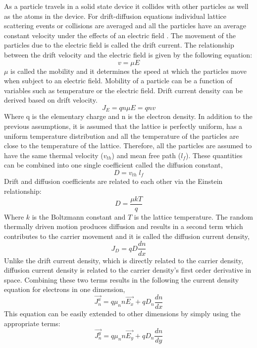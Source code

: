 \begin{doublespace}
As a particle travels in a solid state device it collides with other particles as well as the atoms in the device. For  drift-diffusion equations individual lattice scattering events or collisions are averaged and all the particles have an average constant  velocity under the effects of an electric field \cite{snowden}. The movement of the particles due to the electric field is called the drift current. The relationship between the drift velocity and the electric field is given by the following equation:
\begin{equation}
v=\mu E
\end{equation}
$\mu$ is called the mobility and it determines the  speed at which the particles  move when subject to an electric field. Mobility of a particle can be a function of  variables such as temperature or the electric field. Drift current density can be derived based on  drift velocity\cite{snowden}.
\begin{equation}
J_E=q n\mu E=q n v 
\end{equation}
Where q is the elementary charge and n is the electron density. In addition to the previous assumptions, it is assumed that the lattice is perfectly uniform, has a uniform temperature distribution and all the temperature of the particles are close to the temperature of the lattice. Therefore, all the particles are assumed to have the same thermal velocity ($v_{th}$) and mean free path ($l_f$). These quantities can be combined into one single coefficient called the diffusion constant,
\begin{equation}
D=v_{th} \;l_f
\end{equation}
 Drift and diffusion coefficients are related to each other via the Einstein relationship\cite{snowden}:
\begin{equation}
D=\frac{\mu k T}{q}
\end{equation}
Where $k$ is the Boltzmann constant and $T$ is the lattice temperature. The random thermally driven motion produces diffusion and results in a second term which contributes to the carrier movement and it is called the diffusion current density,
\begin{equation}
J_D=qD\frac{dn}{dx}
\end{equation}
Unlike the drift current density, which is directly related to the carrier density, diffusion current density is related to the carrier density's first order derivative in space. Combining these two terms results in the following the current density equation for electrons in one dimension,
\begin{equation}
\vec{J_n^x}=q \mu_{n} n \vec{E_x}+qD_{n} \frac{dn}{dx} 
\label{cdenn}
\end{equation}
This equation can be easily extended to other dimensions by simply using the appropriate terms:
\begin{equation}
\vec{J_n^y}=q \mu_{n} n \vec{E_y}+qD_{n} \frac{dn}{dy} 
\end{equation}


\end{doublespace}
